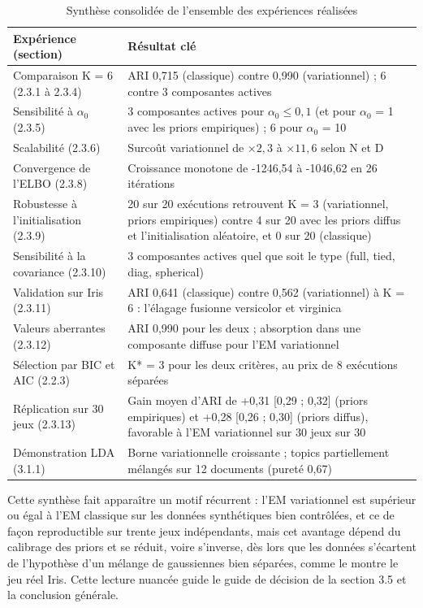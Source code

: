 \begin{table}[H]
\centering
\small
\setlength{\tabcolsep}{0.14cm}
\begin{tabular}{|p{5.2cm}|p{9.6cm}|}
\hline
\textbf{Expérience (section)} & \textbf{Résultat clé} \\
\hline
Comparaison K = 6 (2.3.1 à 2.3.4) & ARI 0,715 (classique) contre 0,990 (variationnel) ; 6 contre 3 composantes actives \\
\hline
Sensibilité à $\alpha _{0}$ (2.3.5) & 3 composantes actives pour $\alpha _{0} \leq 0,1$ (et pour $\alpha _{0}$ = 1 avec les priors empiriques) ; 6 pour $\alpha _{0}$ = 10 \\
\hline
Scalabilité (2.3.6) & Surcoût variationnel de $\times 2,3$ à $\times 11,6$ selon N et D \\
\hline
Convergence de l'ELBO (2.3.8) & Croissance monotone de -1246,54 à -1046,62 en 26 itérations \\
\hline
Robustesse à l'initialisation (2.3.9) & 20 sur 20 exécutions retrouvent K = 3 (variationnel, priors empiriques) contre 4 sur 20 avec les priors diffus et l'initialisation aléatoire, et 0 sur 20 (classique) \\
\hline
Sensibilité à la covariance (2.3.10) & 3 composantes actives quel que soit le type (full, tied, diag, spherical) \\
\hline
Validation sur Iris (2.3.11) & ARI 0,641 (classique) contre 0,562 (variationnel) à K = 6 : l'élagage fusionne versicolor et virginica \\
\hline
Valeurs aberrantes (2.3.12) & ARI 0,990 pour les deux ; absorption dans une composante diffuse pour l'EM variationnel \\
\hline
Sélection par BIC et AIC (2.2.3) & K* = 3 pour les deux critères, au prix de 8 exécutions séparées \\
\hline
Réplication sur 30 jeux (2.3.13) & Gain moyen d'ARI de +0,31 [0,29 ; 0,32] (priors empiriques) et +0,28 [0,26 ; 0,30] (priors diffus), favorable à l'EM variationnel sur 30 jeux sur 30 \\
\hline
Démonstration LDA (3.1.1) & Borne variationnelle croissante ; topics partiellement mélangés sur 12 documents (pureté 0,67) \\
\hline
\end{tabular}
\caption{Synthèse consolidée de l'ensemble des expériences réalisées}
\label{tab:3_3}
\end{table}
Cette synthèse fait apparaître un motif récurrent : l'EM variationnel est supérieur ou égal à l'EM classique sur les données synthétiques bien contrôlées, et ce de façon reproductible sur trente jeux indépendants, mais cet avantage dépend du calibrage des priors et se réduit, voire s'inverse, dès lors que les données s'écartent de l'hypothèse d'un mélange de gaussiennes bien séparées, comme le montre le jeu réel Iris. Cette lecture nuancée guide le guide de décision de la section 3.5 et la conclusion générale.

